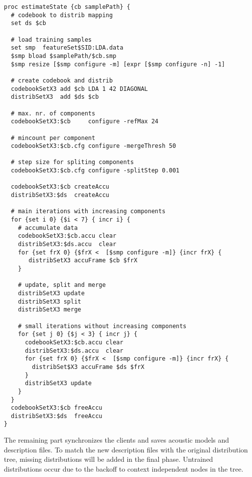 \begin{verbatim}
proc estimateState {cb samplePath} {
  # codebook to distrib mapping
  set ds $cb 

  # load training samples
  set smp  featureSet$SID:LDA.data
  $smp bload $samplePath/$cb.smp
  $smp resize [$smp configure -m] [expr [$smp configure -n] -1]

  # create codebook and distrib
  codebookSetX3 add $cb LDA 1 42 DIAGONAL
  distribSetX3  add $ds $cb

  # max. nr. of components
  codebookSetX3:$cb     configure -refMax 24

  # mincount per component
  codebookSetX3:$cb.cfg configure -mergeThresh 50

  # step size for spliting components
  codebookSetX3:$cb.cfg configure -splitStep 0.001

  codebookSetX3:$cb createAccu
  distribSetX3:$ds  createAccu

  # main iterations with increasing components
  for {set i 0} {$i < 7} { incr i} { 
    # accumulate data
    codebookSetX3:$cb.accu clear
    distribSetX3:$ds.accu  clear
    for {set frX 0} {$frX <  [$smp configure -m]} {incr frX} {
       distribSetX3 accuFrame $cb $frX
    }

    # update, split and merge
    distribSetX3 update
    distribSetX3 split
    distribSetX3 merge

    # small iterations without increasing components
    for {set j 0} {$j < 3} { incr j} { 
      codebookSetX3:$cb.accu clear
      distribSetX3:$ds.accu  clear
      for {set frX 0} {$frX <  [$smp configure -m]} {incr frX} {
        distribSet$X3 accuFrame $ds $frX
      }
      distribSetX3 update
    }
  }
  codebookSetX3:$cb freeAccu
  distribSetX3:$ds  freeAccu
}
\end{verbatim}

The remaining part synchronizes the clients  and saves acoustic models
and description files.  To match   the new description files with  the
original distribution tree, missing distributions will be added in the
final  phase.  Untrained  distributions  occur due  to  the backoff to
context independent nodes in the tree.


